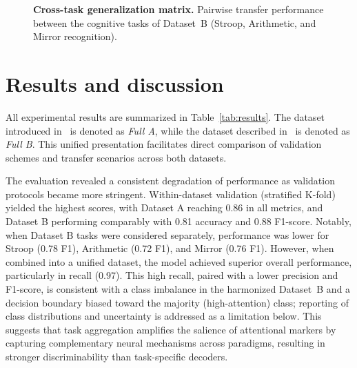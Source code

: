 \documentclass[10pt,letterpaper]{article}
\newcommand{\rev}[1]{#1} %
\providecommand{\DIFdelbegin}{} %
\providecommand{\DIFaddbeginFL}{} %
\providecommand{\DIFaddendFL}{} %
\providecommand{\DIFdelendFL}{} %
\providecommand{\DIFscaledelfig}{0.5}
\newlength{\DIFdelgraphicswidth} %
\newlength{\DIFdelgraphicsheight} %
\providecommand{\DIFaddincludegraphics}[2][]{{\color{blue}\fbox{\DIFOincludegraphics[#1]{#2}}}} %
\providecommand{\DIFdelincludegraphics}[2][]{%
\sbox{\DIFdelgraphicsbox}{\DIFOincludegraphics[#1]{#2}}%
\settoboxwidth{\DIFdelgraphicswidth}{\DIFdelgraphicsbox} %
\settoboxtotalheight{\DIFdelgraphicsheight}{\DIFdelgraphicsbox} %
\scalebox{\DIFscaledelfig}{%
\parbox[b]{\DIFdelgraphicswidth}{\usebox{\DIFdelgraphicsbox}\\[-\baselineskip] \rule{\DIFdelgraphicswidth}{0em}}\llap{\resizebox{\DIFdelgraphicswidth}{\DIFdelgraphicsheight}{%
\setlength{\unitlength}{\DIFdelgraphicswidth}%
\begin{picture}(1,1)%
\thicklines\linethickness{2pt} %
{\color[rgb]{1,0,0}\put(0,0){\framebox(1,1){}}}%
{\color[rgb]{1,0,0}\put(0,0){\line( 1,1){1}}}%
{\color[rgb]{1,0,0}\put(0,1){\line(1,-1){1}}}%
\end{picture}%
}\hspace*{3pt}}} %
} %
\DeclareRobustCommand{\DIFdelbegin}{\DIFOdelbegin \let\includegraphics\DIFdelincludegraphics} %
\DeclareRobustCommand{\DIFaddbeginFL}{\DIFOaddbeginFL \let\includegraphics\DIFaddincludegraphics} %
\DeclareRobustCommand{\DIFaddendFL}{\DIFOaddendFL \let\includegraphics\DIFOincludegraphics} %
\DeclareRobustCommand{\DIFdelendFL}{\DIFOaddendFL \let\includegraphics\DIFOincludegraphics} %
\begin{document}
\DIFdelbegin %
\DIFdelendFL \DIFaddbeginFL \begin{figure}[!h]
\DIFaddendFL \caption{\textbf{Cross-task generalization matrix.}
Pairwise transfer performance between the cognitive tasks of Dataset~B (Stroop, Arithmetic, and Mirror recognition).}
\label{fig:cross-task}
\end{figure}

\section*{Results and discussion}

All experimental results are summarized in Table~\ref{tab:results}. The dataset introduced in~\cite{aci2019attention} is denoted as \textit{Full A}, while the dataset described in~\cite{ghosh2022sam40} is denoted as \textit{Full B}. This unified presentation facilitates direct comparison of validation schemes and transfer scenarios across both datasets.

The evaluation revealed a consistent degradation of performance as validation protocols became more stringent. Within-dataset validation (stratified K-fold) yielded the highest scores, with Dataset A reaching 0.86 in all metrics, and Dataset B performing comparably with 0.81 accuracy and 0.88 F1-score. Notably, when Dataset B tasks were considered separately, performance was lower for Stroop (0.78 F1), Arithmetic (0.72 F1), and Mirror (0.76 F1). However, when combined into a unified dataset, the model achieved superior overall performance, particularly in recall (0.97). \rev{This high recall, paired with a lower precision and F1-score, is consistent with a class imbalance in the harmonized Dataset~B and a decision boundary biased toward the majority (high-attention) class; reporting of class distributions and uncertainty is addressed as a limitation below.} This suggests that task aggregation amplifies the salience of attentional markers by capturing complementary neural mechanisms across paradigms, resulting in stronger discriminability than task-specific decoders.
\end{document}

